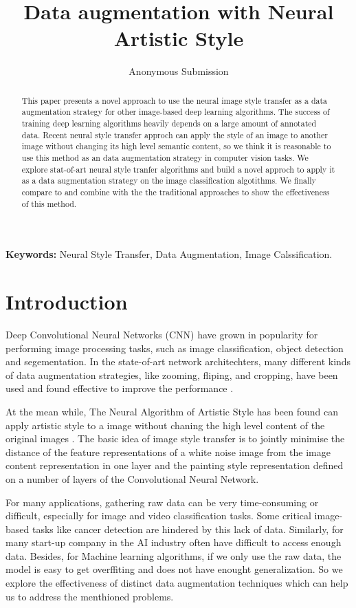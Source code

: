\documentclass[a4paper,11pt]{article}
\begin{document}
\title{Data augmentation with Neural Artistic Style}
\author{Anonymous Submission}
\date{}
\maketitle
\thispagestyle{empty}


\begin{abstract}
This paper presents a novel approach to use the neural image style transfer as a data augmentation strategy for other image-based deep learning algorithms. The success of training deep learning algorithms heavily depends on a large amount of annotated data. Recent neural style transfer approch can apply the style of an image to another image without changing its high level semantic content, so we think it is reasonable to use this method as an data augmentation strategy in computer vision tasks. We explore stat-of-art neural style tranfer algorithms and build a novel approch to apply it as a data augmentation strategy on the image classification algotithms. We finally compare to and combine with the the traditional approaches to show the effectiveness of this method.
\end{abstract}
\textbf{Keywords:} Neural Style Transfer, Data Augmentation, Image Calssification.

\section{Introduction}
Deep Convolutional Neural Networks (CNN) have grown in popularity for performing image processing tasks, such as image classification, object detection and segementation. In the state-of-art network architechters, many different kinds of data augmentation strategies, like zooming, fliping, and cropping, have been used and found effective to improve the performance \cite{krizhevsky2012imagenet} \cite{simonyan2014very} .

At the mean while, The Neural Algorithm of Artistic Style has been found can apply artistic style to a image without chaning the high level content of the original images \cite{gatys2016image}. The basic idea of image style transfer is to jointly minimise the distance of the feature representations of a white noise image from the image content representation in one layer and the painting style representation defined on a number of layers of the Convolutional Neural Network.

 For many applications, gathering raw data can be very time-consuming or difficult, especially for image and video classification tasks. Some critical image-based tasks like cancer detection \cite{kyprianidis2013state} are hindered by this lack of data. Similarly, for many start-up company in the AI industry often have difficult to access enough data. Besides, for Machine learning algorithms, if we only use the raw data, the model is easy to get overffiting and does not have enought generalization. So we explore the effectiveness of distinct data augmentation techniques which can help us to address the menthioned problems.
\end{document}
